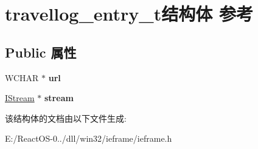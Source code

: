 \hypertarget{structtravellog__entry__t}{}\section{travellog\+\_\+entry\+\_\+t结构体 参考}
\label{structtravellog__entry__t}
\subsection*{Public 属性}
\begin{DoxyCompactItemize}
\item 
\mbox{\label{structtravellog__entry__t_a57ed0ddf236e9253c82c00c6468a3cb3}} 
W\+C\+H\+AR $\ast$ {\bfseries url}
\item 
\mbox{\label{structtravellog__entry__t_ab24a47afd9d5deb0fbc35cd70cd12760}} 
\hyperlink{interface_i_stream}{I\+Stream} $\ast$ {\bfseries stream}
\end{DoxyCompactItemize}


该结构体的文档由以下文件生成\+:\begin{DoxyCompactItemize}
\item 
E\+:/\+React\+O\+S-\/0../dll/win32/ieframe/ieframe.\+h\end{DoxyCompactItemize}
